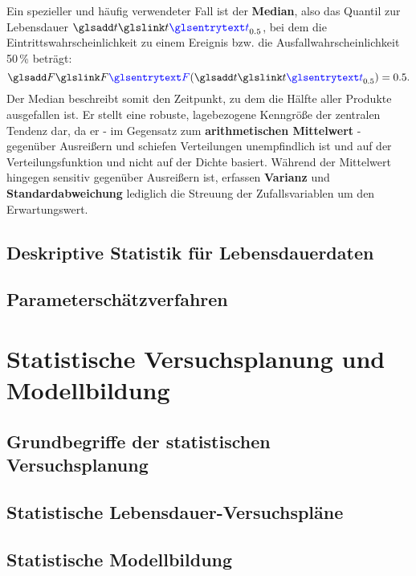 Ein spezieller und häufig verwendeter Fall ist der \textbf{Median}, also das Quantil zur Lebensdauer $\sym{t}_{0.5}$, bei dem die Eintrittswahrscheinlichkeit zu einem Ereignis bzw. die Ausfallwahrscheinlichkeit 50\,\% beträgt:
\begin{equation} \label{eq:mediandef}
    \sym{F}(\sym{t}_{0.5}) = 0.5.
\end{equation}
Der Median beschreibt somit den Zeitpunkt, zu dem die Hälfte aller Produkte ausgefallen ist.
Er stellt eine robuste, lagebezogene Kenngröße der zentralen Tendenz dar, da er - im Gegensatz zum \textbf{arithmetischen Mittelwert} - gegenüber Ausreißern und schiefen Verteilungen unempfindlich ist und auf der Verteilungsfunktion und nicht auf der Dichte basiert.
Während der Mittelwert hingegen sensitiv gegenüber Ausreißern ist, erfassen \textbf{Varianz} und \textbf{Standardabweichung} lediglich die Streuung der Zufallsvariablen um den Erwartungswert.





\subsection{Deskriptive Statistik für Lebensdauerdaten} \label{subsec:stat}

\subsection{Parameterschätzverfahren} \label{subsec:schätzer}

\section{Statistische Versuchsplanung und Modellbildung} \label{sec:doe}

\subsection{Grundbegriffe der statistischen Versuchsplanung} \label{subsec:begriffedoe}

\subsection{Statistische Lebensdauer-Versuchspläne} \label{subsec:pläne}

\subsection{Statistische Modellbildung} \label{subsec:model}
